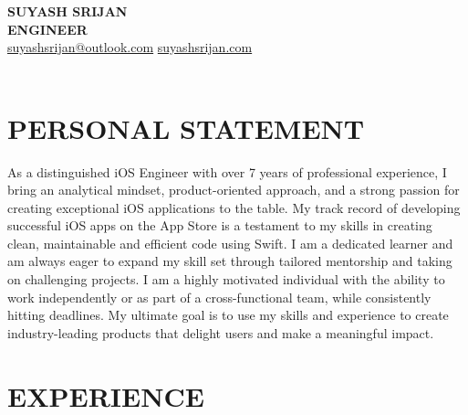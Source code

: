 \documentclass[11pt,a4paper]{article}
\begin{document}
\begin{center}
\textbf{\Huge SUYASH SRIJAN}\\[0.5em]
\textbf{\Large ENGINEER}\\[0.5em]
\href{mailto:suyashsrijan@outlook.com}{suyashsrijan@outlook.com} \quad \href{https://suyashsrijan.com}{suyashsrijan.com}
\linebreak\\
\hrulefill\\[0.5em]
\end{center}

\section*{PERSONAL STATEMENT}
As a distinguished iOS Engineer with over 7 years of professional experience, I bring an analytical mindset, product-oriented approach, and a strong passion for creating exceptional iOS applications to the table. My track record of developing successful iOS apps on the App Store is a testament to my skills in creating clean, maintainable and efficient code using Swift. I am a dedicated learner and am always eager to expand my skill set through tailored mentorship and taking on challenging projects. I am a highly motivated individual with the ability to work independently or as part of a cross-functional team, while consistently hitting deadlines. My ultimate goal is to use my skills and experience to create industry-leading products that delight users and make a meaningful impact.

\section*{EXPERIENCE}
\end{document}

